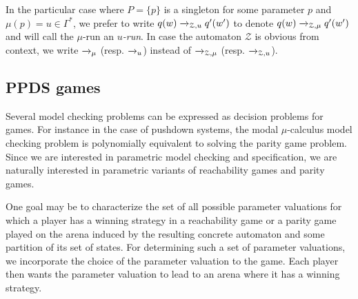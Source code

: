 \documentclass[a4paper,UKenglish,cleveref, autoref, thm-restate]{lipics-v2021}
\newcommand{\problemx}[3]{
	\vspace{0.2cm}
\par\noindent\underline{\sc#1}\par\nobreak\vskip.2\baselineskip
\begingroup\clubpenalty10000\widowpenalty10000
\setbox0\hbox{\bf INPUT:\ }\setbox1\hbox{\bf QUESTION:\ }
\dimen0=\wd0\ifnum\wd1>\dimen0\dimen0=\wd1\fi
\vskip-\parskip\noindent
\hbox to\dimen0{\box0\hfil}\hangindent\dimen0\hangafter1\ignorespaces#2\par
\vskip-\parskip\noindent
\hbox to\dimen0{\box1\hfil}\hangindent\dimen0\hangafter1\ignorespaces#3\par
\endgroup
	\vspace{-0.2cm}
}
\begin{document}
In the particular case where $P=\{p\}$ is a singleton for some parameter $p$ and $\mu(p)=u \in \Gamma^*$,
we prefer to write $q(w)\xrightarrow{%
}_{\mathcal{Z}, u}q'(w')$
to denote $q(w)\xrightarrow{%
}_{\mathcal{Z}, \mu}q'(w')$ and
will call the $\mu$-run an {\em $u$-run}. In case the automaton $\mathcal{Z}$ is obvious from context, we write $\xrightarrow{%
}_{\mu}$ (resp. $\xrightarrow{%
}_{u}$)
instead of $\xrightarrow{%
}_{\mathcal{Z}, \mu}$ (resp. $\xrightarrow{%
}_{\mathcal{Z},u}$). \\

\subsection{PPDS games}


Several model checking problems can be
expressed as decision problems for games.
For instance 
in the case of pushdown systems, 
the modal $\mu$-calculus
model checking problem is polynomially equivalent to solving the parity game problem.
Since we are interested in parametric model checking and specification,
we are naturally interested in parametric variants of reachability games and parity games.

One goal may be to characterize the set of all possible parameter valuations for which a player has a winning strategy in a 
reachability game or a parity game
played on the arena induced by the
resulting concrete automaton
and some partition of its set of states. 
For determining such a set of parameter valuations, we incorporate the choice of the parameter valuation to the game. Each player then wants the parameter valuation to lead to an arena where it has a winning strategy.
\end{document}
